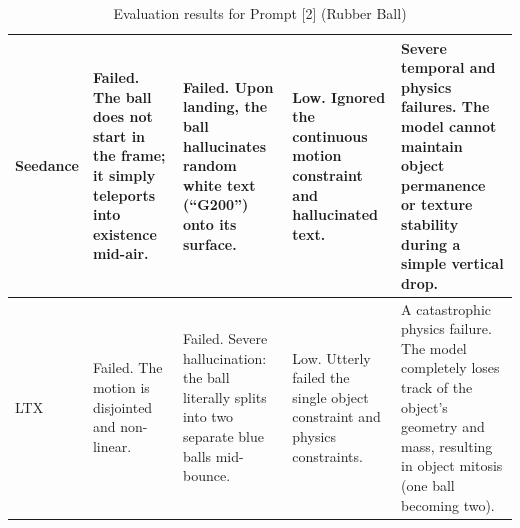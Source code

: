 \documentclass[sigconf]{acmart}
\begin{document}
\begin{table}[H]
\begin{tabularx}{\textwidth}{| l | >{\raggedright\arraybackslash}X | >{\raggedright\arraybackslash}X | >{\raggedright\arraybackslash}X | >{\raggedright\arraybackslash}X |}
        Seedance       & Failed. The ball does not start in the frame; it simply teleports into existence mid-air.     & Failed. Upon landing, the ball hallucinates random white text (``G200'') onto its surface.               & Low. Ignored the continuous motion constraint and hallucinated text.                           & Severe temporal and physics failures. The model cannot maintain object permanence or texture stability during a simple vertical drop.                          \\ \hline
        LTX            & Failed. The motion is disjointed and non-linear.                                              & Failed. Severe hallucination: the ball literally splits into two separate blue balls mid-bounce.         & Low. Utterly failed the single object constraint and physics constraints.                      & A catastrophic physics failure. The model completely loses track of the object's geometry and mass, resulting in object mitosis (one ball becoming two).       \\ \hline
    \end{tabularx}
    \caption{Evaluation results for Prompt [2] (Rubber Ball)}
    \label{tab:rubberball}
\end{table}
\end{document}
